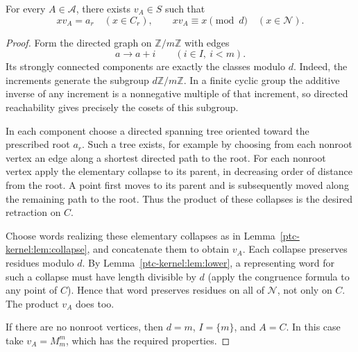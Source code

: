 \begin{lemma}\label{ptc-kernel:lem:retraction}
For every $A\in\mathcal A$, there exists $v_A\in S$ such that
\[
 xv_A=a_r\quad(x\in C_r),\qquad
 xv_A\equiv x\pmod d\quad(x\in\mathcal N).
\]
\end{lemma}
\begin{proof}
Form the directed graph on $\mathbb{Z}/m\mathbb{Z}$ with edges
\[
 a\longrightarrow a+i\qquad(i\in I,\ i<m).
\]
Its strongly connected components are exactly the classes modulo $d$.
Indeed, the increments generate the subgroup $d\mathbb{Z}/m\mathbb{Z}$. In a finite
cyclic group the additive inverse of any increment is a nonnegative
multiple of that increment, so directed reachability gives precisely
the cosets of this subgroup.

In each component choose a directed spanning tree oriented toward the
prescribed root $a_r$. Such a tree exists, for example by choosing from
each nonroot vertex an edge along a shortest directed path to the root.
For each nonroot vertex apply the elementary collapse to its parent,
in decreasing order of distance from the root. A point first moves to
its parent and is subsequently moved along the remaining path to the
root. Thus the product of these collapses is the desired retraction
on $C$.

Choose words realizing these elementary collapses as in
Lemma~\ref{ptc-kernel:lem:collapse}, and concatenate them to obtain $v_A$.
Each collapse preserves residues modulo $d$. By
Lemma~\ref{ptc-kernel:lem:lower}, a representing word for such a collapse must
have length divisible by $d$ (apply the congruence formula to any point
of $C$). Hence that word preserves residues on all of $\mathcal N$,
not only on $C$. The product $v_A$ does too.

If there are no nonroot vertices, then $d=m$, $I=\{m\}$, and $A=C$.
In this case take $v_A=M_m^m$, which has the required properties.
\end{proof}
